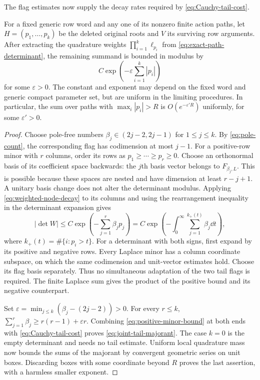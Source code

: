 The flag estimates now supply the decay rates required by
\eqref{eq:Cauchy-tail-cost}.

\begin{lemma}\label{lem:joint-determinant-tails}
For a fixed generic row word and any one of its nonzero finite
action paths, let $H=(p_1,\ldots,p_k)$ be the deleted original
roots and $V$ its surviving row arguments.
After extracting the quadrature weights $\prod_{i=1}^k\ell_{p_i}$
from \eqref{eq:exact-path-determinant}, the remaining summand is
bounded in modulus by
\begin{equation}\label{eq:joint-tail-majorant}
 C\exp\left(-\varepsilon\sum_{i=1}^k|p_i|\right)
\end{equation}
for some $\varepsilon>0$.  The constant and exponent may depend
on the fixed word and generic compact parameter set, but are
uniform in the limiting procedures.  In particular, the sum over
paths with $\max_i|p_i|>R$ is $O(e^{-\varepsilon'R})$ uniformly,
for some $\varepsilon'>0$.
\end{lemma}

\begin{proof}
Choose pole-free numbers
$\beta_j\in(2j-2,2j-1)$ for $1\le j\le k$.
By \eqref{eq:pole-count}, the corresponding flag has
codimension at most $j-1$.
For a positive-row minor with $r$ columns, order its rows as
$p_1\ge\cdots\ge p_r\ge0$.
Choose an orthonormal basis of its coefficient space backwards:
the $j$th basis vector belongs to $F_{\beta_j,L}$.
This is possible because these spaces are nested and have
dimension at least $r-j+1$.  A unitary basis change does not alter
the determinant modulus.  Applying
\eqref{eq:weighted-node-decay} to its columns and using the
rearrangement inequality in the determinant expansion gives
\begin{equation}\label{eq:positive-minor-bound}
 |\det W|\le C\exp\left(-\sum_{j=1}^r\beta_jp_j\right)
   =C\exp\left(-\int_0^\infty
                \sum_{j=1}^{k_+(t)}\beta_j\dd t\right),
\end{equation}
where $k_+(t)=\#\{i:p_i>t\}$.
For a determinant with both signs, first expand by its positive
and negative rows.  Every Laplace minor has a column coordinate
subspace, on which the same codimension and unit-vector estimates
hold.  Choose its flag basis separately.  Thus no simultaneous
adaptation of the two tail flags is required.  The finite Laplace
sum gives the product of the positive bound and its negative
counterpart.

Set $\varepsilon=\min_{j\le k}(\beta_j-(2j-2))>0$.
For every $r\le k$,
$\sum_{j=1}^r\beta_j\ge r(r-1)+\varepsilon r$.
Combining \eqref{eq:positive-minor-bound} at both ends with
\eqref{eq:Cauchy-tail-cost} proves
\eqref{eq:joint-tail-majorant}.  The case $k=0$ is the empty
determinant and needs no tail estimate.
Uniform local quadrature mass now bounds the sums of the
majorant by convergent geometric series on unit boxes.
Discarding boxes with some coordinate beyond $R$ proves the
last assertion, with a harmless smaller exponent.
\end{proof}

